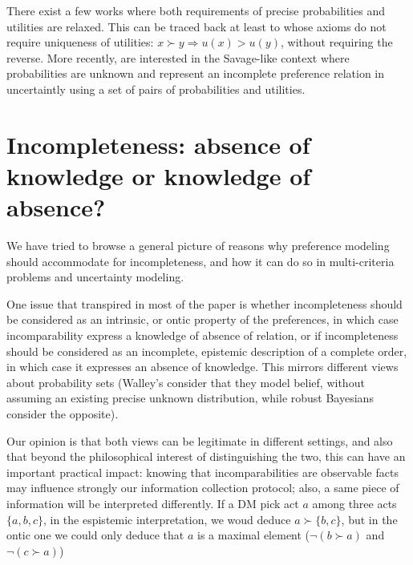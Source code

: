 \documentclass[french, english]{llncs}
\begin{document}
	There exist a few works where both requirements of precise probabilities and utilities are relaxed. This can be traced back at least to \citet{aumann_utility_1962} whose axioms do not require uniqueness of utilities: $x \succ y ⇒ u(x) > u(y)$, without requiring the reverse. More recently, \citet{galaabaatar_subjective_2013} are interested in the Savage-like context where probabilities are unknown and represent an incomplete preference relation in uncertaintly using a set of pairs of probabilities and utilities.


	\section{Incompleteness: absence of knowledge or knowledge of absence?}
	
	We have tried to browse a general picture of reasons why preference modeling should accommodate for incompleteness, and how it can do so in multi-criteria problems and uncertainty modeling. 
	
	One issue that transpired in most of the paper is whether incompleteness should be considered as an intrinsic, or ontic property of the preferences, in which case incomparability express a knowledge of absence of relation, or if incompleteness should be considered as an incomplete, epistemic description of a complete order, in which case it expresses an absence of knowledge. This mirrors different views about probability sets (Walley's consider that they model belief, without assuming an existing precise unknown distribution, while robust Bayesians consider the opposite). 
	
	Our opinion is that both views can be legitimate in different settings, and also that beyond the philosophical interest of distinguishing the two, this can have an important practical impact: knowing that incomparabilities are observable facts may influence strongly our information collection protocol; also, a same piece of information will be interpreted differently. If a \ac{DM} pick act $a$ among three acts $\{a,b,c\}$, in the espistemic interpretation, we woud deduce $a \succ \{b,c\}$, but in the ontic one we could only deduce that $a$ is a maximal element ($\neg(b\succ a)$ and $\neg(c\succ a)$)


\end{document}
